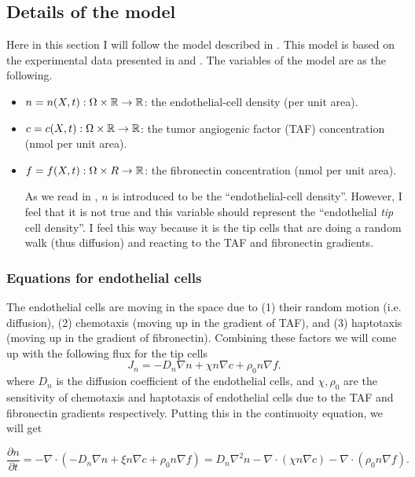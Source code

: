 \subsection{Details of the model}
Here in this section I will follow the model described in \cite{Anderson1998}. This model is based on the experimental data presented in \cite{Gimbrone1974} and \cite{Muthukkaruppan1982}. The variables of the model are as the following.

\begin{itemize}
	\item $ n = n(X,t): \Omega \times \mathbb{R} \to \mathbb{R} $: the endothelial-cell density (per unit area).
	\item $ c = c(X,t): \Omega \times \mathbb{R} \to \mathbb{R} $: the tumor angiogenic factor (TAF) concentration (nmol per unit area).
	\item $ f = f(X,t): \Omega \times R \to \mathbb{R} $: the fibronectin concentration (nmol per unit area).
	
\begin{strangeObs}
	\label{strange:AmbiguityOfTipCell}
	As we read in \cite{Anderson1998}, $ n $ is introduced to be the ``endothelial-cell density''. However, I feel that it is not true and this variable should represent the ``endothelial \emph{tip} cell density''. I feel this way because it is the tip cells that are doing a random walk (thus diffusion) and reacting to the TAF and fibronectin gradients.
\end{strangeObs}
\end{itemize}

\subsubsection{Equations for endothelial cells}
The endothelial cells are moving in the space due to (1) their random motion (i.e. diffusion), (2) chemotaxis (moving up in the gradient of TAF), and (3) haptotaxis (moving up in the gradient of fibronectin). Combining these factors we will come up with the following flux for the tip cells
\[ J_n = -D_n \nabla n + \chi n \nabla c + \rho_0 n \nabla f. \]
where $ D_n $ is the diffusion coefficient of the endothelial cells, and $ \chi, \rho_0 $ are the sensitivity of chemotaxis and haptotaxis of endothelial cells due to the TAF and fibronectin gradients respectively.
Putting this in the continuoity equation, we will get

\[ \frac{\partial n}{\partial t} = -\nabla\cdot (-D_n \nabla n + \xi n \nabla c + \rho_0 n \nabla f) = D_n\nabla^2 n  - \nabla\cdot(\chi n\nabla c) - \nabla\cdot(\rho_0 n \nabla f).    \]


